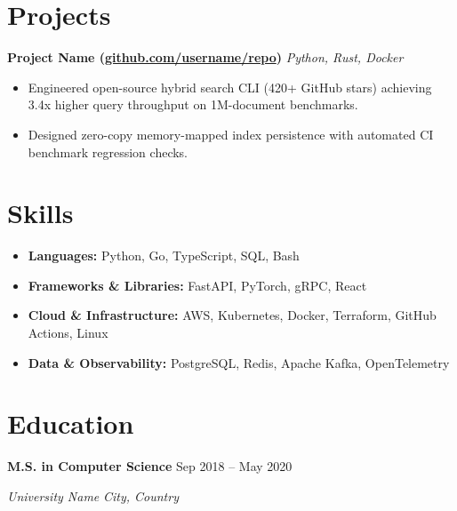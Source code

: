 \documentclass[10pt,a4paper]{article}
\newcommand{\resumeRole}[4]{%
  \vspace{4pt}%
  {\textbf{#1} \hfill #2 \par}%
  {\textit{#3} \hfill \textit{#4} \par}%
}
\newcommand{\resumeProject}[2]{%
  \vspace{4pt}%
  {\textbf{#1} \hfill \textit{#2} \par}%
}
\begin{document}
\section{Projects}

\resumeProject{Project Name (\href{https://github.com/username/repo}{github.com/username/repo})}{Python, Rust, Docker}
\begin{itemize}
  \item Engineered open-source hybrid search CLI (420+ GitHub stars) achieving 3.4x higher query throughput on 1M-document benchmarks.
  \item Designed zero-copy memory-mapped index persistence with automated CI benchmark regression checks.
\end{itemize}

\section{Skills}
\begin{itemize}
  \item \textbf{Languages:} Python, Go, TypeScript, SQL, Bash
  \item \textbf{Frameworks \& Libraries:} FastAPI, PyTorch, gRPC, React
  \item \textbf{Cloud \& Infrastructure:} AWS, Kubernetes, Docker, Terraform, GitHub Actions, Linux
  \item \textbf{Data \& Observability:} PostgreSQL, Redis, Apache Kafka, OpenTelemetry
\end{itemize}

\section{Education}

\resumeRole{M.S. in Computer Science}{Sep 2018 -- May 2020}{University Name}{City, Country}
\end{document}
